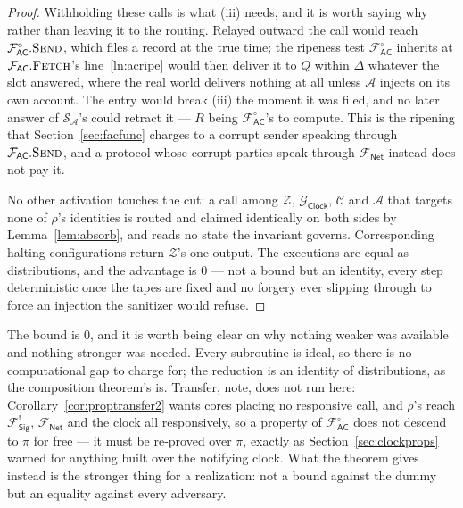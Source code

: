 \documentclass[10pt,oneside,openany]{book}
\newcommand{\Corr}{\mathcal{C}}
\newcommand{\Zenv}{\mathcal{Z}}
\newcommand{\Adv}{\mathcal{A}}
\newcommand{\Sim}{\mathcal{S}}
\newcommand{\op}[1]{\textnormal{\textsc{#1}}}
\newcommand{\Fsig}{\mathcal{F}_{\mathsf{Sig}}}
\newcommand{\Gclock}{\mathcal{G}_{\mathsf{Clock}}}
\newcommand{\Fnet}{\mathcal{F}_{\mathsf{Net}}}
\newcommand{\Fac}{\mathcal{F}_{\mathsf{AC}}}
\newcommand{\Facz}{\mathcal{F}^{\circ}_{\mathsf{AC}}}
\theoremstyle{accentdef}
\theoremstyle{accentplain}
\begin{document}
\begin{proof}
Withholding these calls is what (iii) needs, and it is worth saying why rather than leaving it to
the routing. Relayed outward the call would reach $\Facz.\op{Send}$, which files a record at the
true time; the ripeness test $\Facz$ inherits at $\Fac.\op{Fetch}$'s line~\ref{ln:acripe} would
then deliver it to $Q$ within $\Delta$ whatever the slot answered, where the real world delivers
nothing at all unless $\Adv$ injects on its own account.
The entry would break (iii) the moment it was filed, and no later answer of $\Sim_{\Adv}$'s could
retract it --- $R$ being $\Facz$'s to compute. This is the ripening that
Section~\ref{sec:facfunc} charges to a corrupt sender speaking through $\Fac.\op{Send}$, and a
protocol whose corrupt parties speak through $\Fnet$ instead does not pay it.

No other activation touches the cut: a call among $\Zenv$, $\Gclock$, $\Corr$ and $\Adv$ that
targets none of $\rho$'s identities is routed and claimed identically on both sides by
Lemma~\ref{lem:absorb}, and reads no state the invariant governs. Corresponding halting
configurations return $\Zenv$'s one output. The
executions are equal as distributions, and the advantage is $0$ --- not a bound but an identity,
every step deterministic once the tapes are fixed and no forgery ever slipping through to force
an injection the sanitizer would refuse.
\end{proof}

The bound is $0$, and it is worth being clear on why nothing weaker was available and nothing
stronger was needed. Every subroutine is ideal, so there is no computational gap to charge for;
the reduction is an identity of distributions, as the composition theorem's is. Transfer, note,
does not run here: Corollary~\ref{cor:proptransfer2} wants cores placing no responsive call, and
$\rho$'s reach $\Fsig^{!}$, $\Fnet$ and the clock all responsively, so a property of $\Facz$ does
not descend to $\pi$ for free --- it must be re-proved over $\pi$, exactly as
Section~\ref{sec:clockprops} warned for anything built over the notifying clock. What the theorem
gives instead is the stronger thing for a realization: not a bound against the dummy but an
equality against every adversary.
\end{document}
